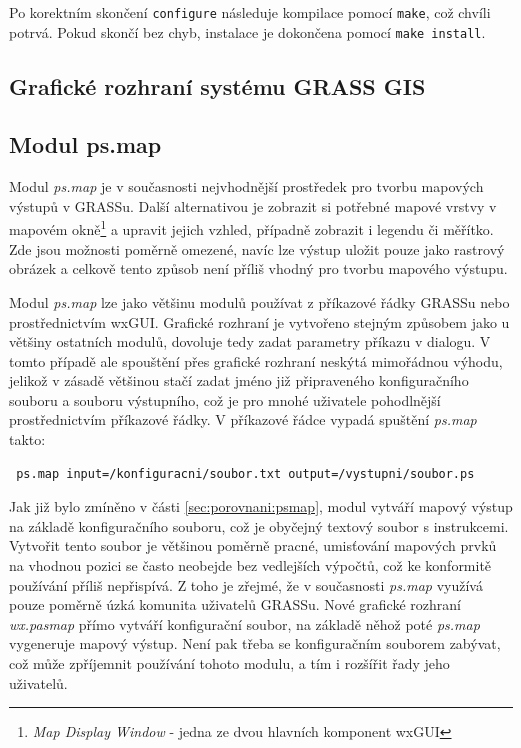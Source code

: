 \documentclass[a4paper,12pt,draft]{article}
\newcommand{\modul}[1]{\emph{#1}}
\begin{document}
Po korektním skončení \verb|configure| následuje kompilace pomocí \verb|make|, což chvíli potrvá. Pokud skončí bez chyb, instalace je dokončena pomocí \verb|make install|. 


\subsection{Grafické rozhraní systému GRASS GIS}

\subsection{Modul ps.map}
\label{sec:psmap}
Modul \modul{ps.map} je v současnosti nejvhodnější prostředek pro tvorbu mapových výstupů v GRASSu. Další alternativou je zobrazit si potřebné mapové vrstvy v mapovém okně\footnote{\emph{Map Display Window} - jedna ze dvou hlavních komponent wxGUI} a upravit jejich vzhled, případně zobrazit i legendu či měřítko. Zde jsou možnosti poměrně omezené, navíc lze výstup uložit pouze jako rastrový obrázek a celkově tento způsob není příliš vhodný pro tvorbu mapového výstupu.

Modul \modul{ps.map} lze jako většinu modulů používat z příkazové řádky GRASSu nebo pro\-střed\-nic\-tvím wxGUI. Grafické rozhraní je vytvořeno stejným způsobem jako u většiny ostatních modulů, dovoluje tedy zadat parametry příkazu v dialogu. V tomto případě ale spouštění přes grafické rozhraní neskýtá mimořádnou výhodu, jelikož v zásadě většinou stačí zadat jméno již připraveného konfiguračního souboru a souboru výstupního, což je pro mnohé uživatele pohodlnější prostřednictvím příkazové řádky. V příkazové řádce vypadá spuštění \modul{ps.map} takto:
\begin{verbatim}
 ps.map input=/konfiguracni/soubor.txt output=/vystupni/soubor.ps   
\end{verbatim}

Jak již bylo zmíněno v části \ref{sec:porovnani:psmap}, modul vytváří mapový výstup na základě konfiguračního souboru, což je obyčejný textový soubor s instrukcemi. Vytvořit tento soubor je většinou poměrně pracné, umisťování mapových prvků na vhodnou pozici se často neobejde bez vedlejších výpočtů, což ke konformitě používání příliš nepřispívá. Z toho je zřejmé, že v současnosti \modul{ps.map} využívá pouze poměrně úzká komunita uživatelů GRASSu. Nové grafické rozhraní \emph{wx.pasmap} přímo vytváří konfigurační soubor, na základě něhož poté \modul{ps.map} vygeneruje mapový výstup. Není pak třeba se konfiguračním souborem zabývat, což může zpříjemnit používání tohoto modulu, a tím i rozšířit řady jeho uživatelů. 
\end{document}
